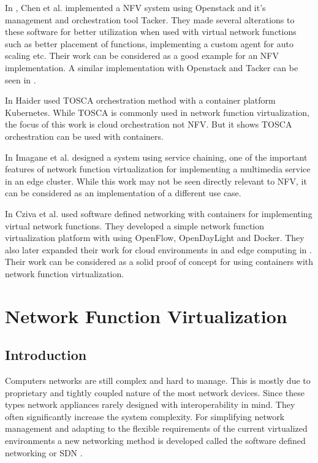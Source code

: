 \documentclass[12pt,oneandhalf,chaparabic,ceng,ms,eng,oneside,pntc]{gsufbe}
\begin{document}
In \cite{chen_implementing_2017}, Chen et al. implemented a NFV system using Openstack and it's
management and orchestration tool Tacker. They made several alterations to these software for better
utilization when used with virtual network functions such as better placement of functions, implementing
a custom agent for auto scaling etc. Their work can be considered as a good example for an NFV
implementation. A similar implementation with Openstack and Tacker can be seen in \cite{tahir_master}.

In \cite{haider_md_rezzakul_deployment_2017} Haider used TOSCA orchestration method with a container
platform Kubernetes. While TOSCA is commonly used in network function virtualization, the focus of this
work is cloud orchestration not NFV. But it shows TOSCA orchestration can be used with containers.

In \cite{imagane_performance_2018} Imagane et al. designed a system using service chaining, one of the
important features of network function virtualization for implementing a multimedia service in an edge
cluster. While this work may not be seen directly relevant to NFV, it can be considered as an
implementation of a different use case.

In \cite{cziva_container-based_2015} Cziva et al. used software defined networking with containers for
implementing virtual network functions. They developed a simple network function virtualization platform
with using OpenFlow, OpenDayLight and Docker. They also later expanded their work for cloud environments
in \cite{cziva_gnfc_2015} and edge computing in \cite{cziva_container_2017}. Their work can be 
considered as a solid proof of concept for using containers with network function virtualization.

\chapter{Network Function Virtualization}
\section{Introduction}
Computers networks are still complex and hard to manage. This is mostly due to proprietary and tightly
coupled nature of the most network devices. Since these types network appliances rarely designed with
interoperability in mind. They often significantly increase the system complexity. For simplifying
network management and adapting to the flexible requirements of the current virtualized environments a
new networking method is developed called the software defined networking or SDN
\cite{chayapathi_network_2016}.
\end{document}
